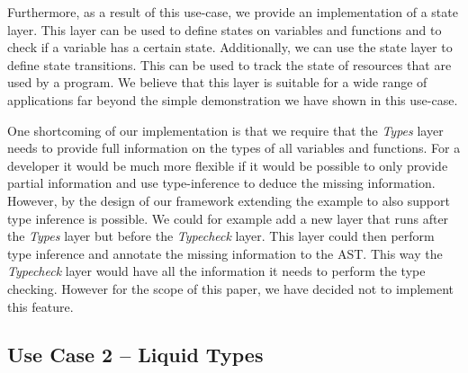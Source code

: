 Furthermore, as a result of this use-case, we provide an implementation of a state layer. This layer can be used to define states on variables and functions and to check if a variable has a certain state. Additionally, we can use the state layer to define state transitions. This can be used to track the state of resources that are used by a program. We believe that this layer is suitable for a wide range of applications far beyond the simple demonstration we have shown in this use-case.

One shortcoming of our implementation is that we require that the \textit{Types} layer needs to provide full information on the types of all variables and functions. For a developer it would be much more flexible if it would be possible to only provide partial information and use type-inference to deduce the missing information. However, by the design of our framework extending the example to also support type inference is possible. We could for example add a new layer that runs after the \textit{Types} layer but before the \textit{Typecheck} layer. This layer could then perform type inference and annotate the missing information to the AST. This way the \textit{Typecheck} layer would have all the information it needs to perform the type checking. However for the scope of this paper, we have decided not to implement this feature.

\subsection{Use Case 2 -- Liquid Types}
\label{sssec:use_case_2}

